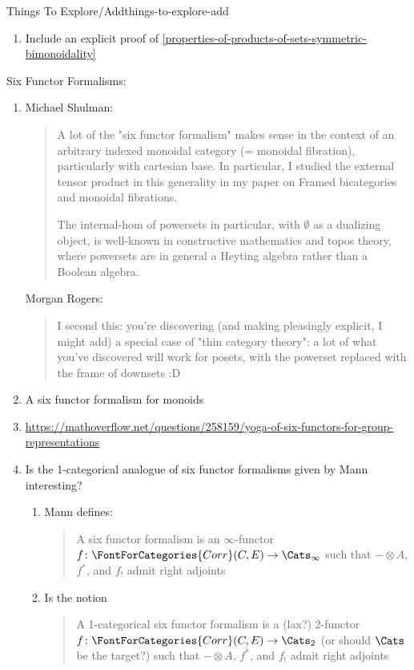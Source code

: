 \begin{remark}{Things To Explore/Add}{things-to-explore-add}
\begin{enumerate}
        \item Include an explicit proof of \cref{properties-of-products-of-sets-symmetric-bimonoidality}
    \end{enumerate}
    Six Functor Formalisms:
    \begin{enumerate}
        \item Michael Shulman: 
            \begin{quote}
                A lot of the "six functor formalism" makes sense in the context of an arbitrary indexed monoidal category (= monoidal fibration), particularly with cartesian base. In particular, I studied the external tensor product in this generality in my paper on Framed bicategories and monoidal fibrations.

                The internal-hom of powersets in particular, with $\emptyset$ as a dualizing object, is well-known in constructive mathematics and topos theory, where powersets are in general a Heyting algebra rather than a Boolean algebra.
            \end{quote}
            Morgan Rogers:
            \begin{quote}
                I second this: you're discovering (and making pleasingly explicit, I might add) a special case of "thin category theory": a lot of what you've discovered will work for posets, with the powerset replaced with the frame of downsets :D
            \end{quote}
        \item A six functor formalism for monoids
        \item \url{https://mathoverflow.net/questions/258159/yoga-of-six-functors-for-group-representations}
        \item Is the 1-categorical analogue of six functor formalisms given by Mann interesting?
            \begin{enumerate}
                \item Mann defines:
                    \begin{quote}
                        A six functor formalism is an $\infty$-functor $f\colon\FontForCategories{Corr}(C,E)\to\Cats_{\infty}$ such that $-\otimes A$, $f^{*}$, and $f_{!}$ admit right adjoints
                    \end{quote}
                \item Is the notion
                    \begin{quote}
                        A 1-categorical six functor formalism is a (lax?) $2$-functor $f\colon\FontForCategories{Corr}(C,E)\to\Cats_{2}$ (or should $\Cats$ be the target?) such that $-\otimes A$, $f^{*}$, and $f_{!}$ admit right adjoints

\end{quote}
\end{enumerate}
\end{enumerate}
\end{remark}
